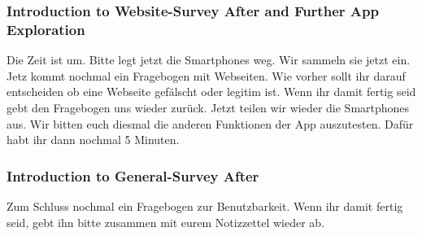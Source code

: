 \subsubsection{Introduction to Website-Survey After and Further App Exploration}
Die Zeit ist um. Bitte legt jetzt die Smartphones weg. Wir sammeln sie jetzt ein.
\newline
\newline
Jetz kommt nochmal ein Fragebogen mit Webseiten. Wie vorher sollt ihr darauf entscheiden ob eine Webseite gef{\"a}lscht oder legitim ist. Wenn ihr damit fertig seid gebt den Fragebogen uns wieder zur{\"u}ck.
\newline
\newline
Jetzt teilen wir wieder die Smartphones aus. Wir bitten euch diesmal die anderen Funktionen der App auszutesten. Daf{\"u}r habt ihr dann nochmal 5 Minuten.


\subsubsection{Introduction to General-Survey After}
Zum Schluss nochmal ein Fragebogen zur Benutzbarkeit. Wenn ihr damit fertig seid, gebt ihn bitte zusammen mit eurem Notizzettel wieder ab.


